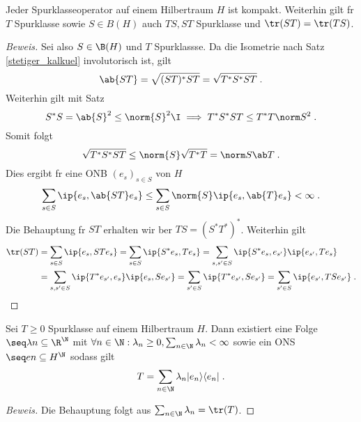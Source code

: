 \begin{theorem}
	Jeder Spurklasseoperator auf einem Hilbertraum $H$ ist kompakt. Weiterhin gilt f\us r $T$ Spurklasse sowie \(S \in B(H)\) auch \(TS, ST\) Spurklasse und \(\tr (ST) = \tr(TS)\).
\end{theorem}
\begin{proof}[Beweis]
	Sei also \(S\in \B(H)\) und $T$ Spurklassse.  Da die Isometrie nach Satz \ref{stetiger_kalkuel} involutorisch ist, gilt
	\[\ab{ST} = \sqrt{(ST)^*ST} = \sqrt{T^*S^*ST}\;.\]
	Weiterhin gilt mit Satz 
	\[S^*S = \ab{S}^2  \leq \norm{S}^2 \I \implies T^* S^* ST \leq T^*T\norm S^2 \;.\]
	Somit folgt
	\[\sqrt{T^*S^*ST} \leq \norm{S} \sqrt{T^*T} = \norm S \ab T\;.\]	
	Dies ergibt f\us r eine ONB \((e_s)_{s\in S}\) von $H$
	\[\sum_{s\in S}\ip{e_s, \ab{ST} e_s} \leq \sum_{s\in S} \norm{S} \ip{e_s, \ab{T}e_s} < \infty\;.\]
	Die Behauptung f\us r $ST$ erhalten wir \us ber \(TS = (S^*T^*)^*\). Weiterhin gilt
	\begin{align*}\tr(ST) &= \sum_{s\in S} \ip{e_s, ST e_s} = \sum_{s\in S} \ip {S^* e_s, T e_s} = \sum_{s, s' \in S}\ip{S^* e_s, e_{s'}}\ip{e_{s'}, Te_s} \\
		&= \sum_{s, s' \in S}\ip{T^* e_{s'}, e_s}\ip{e_s, Se_{s'}} = \sum_{s'\in S} \ip{T^* e_{s'}, S e_{s'}} = \sum_{s'\in S} \ip {e_{s'}, TS e_{s'}}\;.
		\end{align*}
\end{proof}
\begin{theorem}
	Sei \(T\geq 0\) Spurklasse auf einem Hilbertraum $H$. Dann existiert eine Folge \(\seq \lambda n \subseteq \R^\N\) mit \( \forall n\in\N: \lambda_n \geq 0, \sum_{n\in\N} \lambda_n <\infty\) sowie ein ONS \(\seq en \subseteq H^\N\) sodass gilt
	\[ T = \sum_{n\in\N} \lambda_n|e_n\rangle \langle e_n|\;.\]
	\label{spurklasse_geq0_Folge}
\end{theorem}
\begin{proof}[Beweis]
	Die Behauptung folgt aus \(\sum_{n\in\N} \lambda_n = \tr(T)\).
\end{proof}